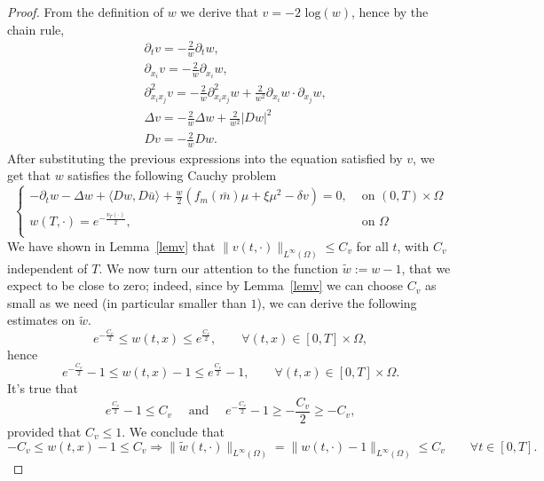 \documentclass[10pt,a4paper,nouppercase,nowrite]{article}
\numberwithin{equation}{section}
\theoremstyle{definition}
\begin{document}
	\begin{proof}
		From the definition of $w$ we derive that $v=-2 \text{ log}(w)$, hence by the chain rule,
		\begin{equation*}
		\begin{aligned}
		& \partial_t v = -\frac{2}{w} \partial_t w, \\
		& \partial_{x_i} v = - \frac{2}{w} \partial_{x_i} w, \\
		& \partial^2_{x_i x_j} v= -\frac{2}{w}\partial^2_{x_i x_j} w + \frac{2}{w^2} \partial_{x_i} w \cdot \partial_{x_j} w, \\
		&\Delta v = - \frac{2}{w} \Delta w + \frac{2}{w^2} |Dw|^2 \\
		&Dv= - \frac{2}{w} Dw.
		\end{aligned}
		\end{equation*}
		After substituting the previous expressions into the equation satisfied by $v$, we get that $w$ satisfies the following Cauchy problem
		\begin{equation*}
			\begin{cases}
				-\partial_t w - \Delta w + \langle Dw,D\bar{u} \rangle + \frac{w}{2} \left( f_m(\bar m) \mu + \xi \mu^2 - \delta v \right)= 0,& \text{ on } (0,T) \times \Omega \\
				w(T,\cdot)=e^{-\frac{v_T(\cdot)}{2}},& \text{ on } \Omega \\
			\end{cases}
			\label{eqforw}
		\end{equation*}
		We have shown in Lemma~\ref{lemv} that $\|v(t,\cdot)\|_{L^{\infty}(\Omega)} \le C_{v}$ for all $t$, with $C_v$ independent of $T$. 
		We now turn our attention to the function $\tilde w := w - 1$, that we expect to be close to zero; indeed, since by Lemma~\ref{lemv} we can choose $C_v$ as small as we need (in particular smaller than $1$), we can derive the following estimates on $\tilde w$.
		$$e^{-\frac{C_v}{2}} \le w(t,x) \le e^{\frac{C_v}{2}}, \qquad \forall (t,x) \in [0,T] \times \Omega,$$
		hence
		$$e^{-\frac{C_v}{2}} - 1 \le w(t,x) - 1 \le e^{\frac{C_v}{2}} - 1, \qquad \forall (t,x) \in [0,T] \times \Omega.$$
		It's true that
		$$e^{\frac{C_v}{2}} - 1 \le C_v \quad \text{ and } \quad e^{-\frac{C_v}{2}} - 1 \ge -\frac{C_v}{2} \ge - C_v,$$
		provided that $C_v \le 1$. We conclude that
		$$-C_v \le w(t,x) - 1 \le C_v \Rightarrow \| \tilde w (t,\cdot) \|_{L^{\infty}(\Omega)} = \|w(t,\cdot) - 1\|_{L^{\infty}(\Omega)} \le C_v \qquad \forall t \in [0,T].$$

\end{proof}
\end{document}
